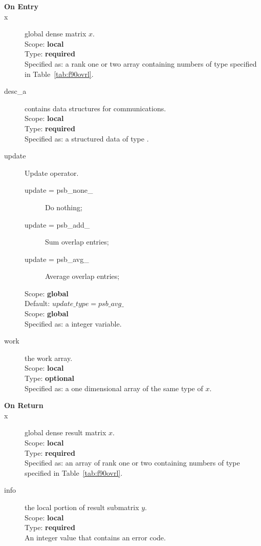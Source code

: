 \begin{description}
\item[\bf On Entry]
\item[x] global dense matrix $x$.\\
Scope: {\bf local} \\
Type: {\bf required} \\
Specified as:  a rank one or two array 
containing numbers of type specified in
Table~\ref{tab:f90ovrl}.
\item[desc\_a] contains data structures for communications.\\
Scope: {\bf local} \\
Type: {\bf required}\\
Specified as: a structured data of type \descdata.
\item[update] Update operator. \\
\begin{description}
\item[update = psb\_none\_] Do nothing;
\item[update = psb\_add\_] Sum overlap entries;
\item[update = psb\_avg\_] Average overlap entries;
\end{description}
Scope: {\bf global} \\
Default: $update\_type = psb\_avg\_ $\\	
Scope: {\bf global} \\
Specified as: a integer variable.
\item[work] the work array. \\
Scope: {\bf local} \\
Type: {\bf optional}\\
Specified as: a one dimensional array of the same type of $x$.

\item[\bf On Return] 
\item[x] global dense result matrix $x$.\\
Scope: {\bf local} \\
Type: {\bf required} \\
Specified as: an  array of rank one or two
containing numbers of type specified in
Table~\ref{tab:f90ovrl}.
\item[info] the local portion of result submatrix $y$.\\
Scope: {\bf local} \\
Type: {\bf required} \\
An integer value that contains an error code. 
\end{description}


